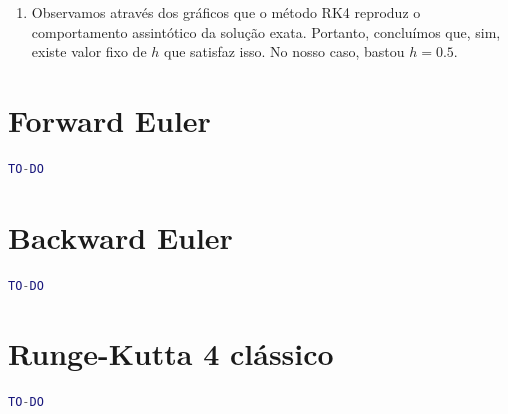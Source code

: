 \documentclass{article}
\begin{document}
\begin{enumerate}
\begin{enumerate}
                    \item Observamos através dos gráficos que o método RK4 reproduz
                        o comportamento assintótico da solução exata. Portanto,
                        concluímos que, sim, existe valor fixo de $h$ que satisfaz
                        isso. No nosso caso, bastou $h = 0.5$.
                \end{enumerate} 
    \end{enumerate}

    \clearpage

    \appendix

    \section{Forward Euler}
        \label{appendix:forward_euler}

        \begin{lstlisting}[language=Matlab]
            TO-DO
        \end{lstlisting}

    \section{Backward Euler}
        \label{appendix:backward_euler}

        \begin{lstlisting}[language=Matlab]
            TO-DO
        \end{lstlisting}

    \section{Runge-Kutta 4 clássico}
        \label{appendix:runge_kutta}

        \begin{lstlisting}[language=Matlab]
            TO-DO
        \end{lstlisting}
\end{document}
